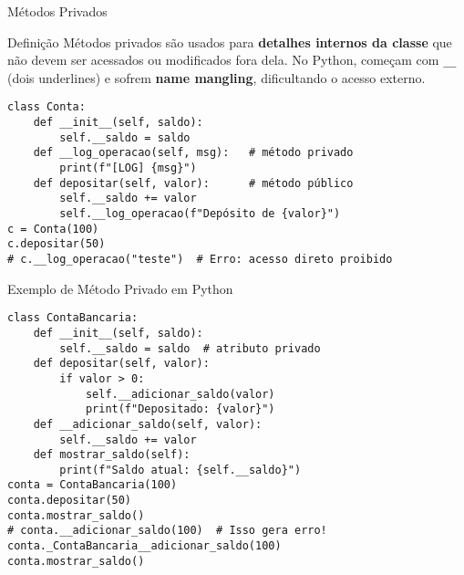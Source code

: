 \begin{frame}[fragile]{Métodos Privados}

    \begin{block}{Definição}
        Métodos privados são usados para \textbf{detalhes internos da classe} que não devem ser acessados ou modificados fora dela.
        No Python, começam com \texttt{\_\_} (dois underlines) e sofrem \textbf{name mangling}, dificultando o acesso externo.
    \end{block}

    \small
    \begin{verbatim}
class Conta:
    def __init__(self, saldo):
        self.__saldo = saldo
    def __log_operacao(self, msg):   # método privado
        print(f"[LOG] {msg}")
    def depositar(self, valor):      # método público
        self.__saldo += valor
        self.__log_operacao(f"Depósito de {valor}")
c = Conta(100)
c.depositar(50)
# c.__log_operacao("teste")  # Erro: acesso direto proibido
\end{verbatim}


\end{frame}


\begin{frame}[fragile]{Exemplo de Método Privado em Python}
    \small
    \begin{verbatim}
class ContaBancaria:
    def __init__(self, saldo):
        self.__saldo = saldo  # atributo privado
    def depositar(self, valor):
        if valor > 0:
            self.__adicionar_saldo(valor)
            print(f"Depositado: {valor}")
    def __adicionar_saldo(self, valor):
        self.__saldo += valor
    def mostrar_saldo(self):
        print(f"Saldo atual: {self.__saldo}")
conta = ContaBancaria(100)
conta.depositar(50)
conta.mostrar_saldo()
# conta.__adicionar_saldo(100)  # Isso gera erro!
conta._ContaBancaria__adicionar_saldo(100)
conta.mostrar_saldo()
\end{verbatim}

\end{frame}




